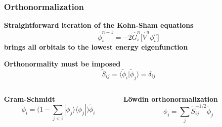 \documentclass[mathserif, 10pt]{beamer}
\begin{document}
\begin{frame}
    \frametitle{Orthonormalization}
    \centering
    \textbf{Straightforward iteration of the Kohn-Sham equations}
    \begin{equation}
        \nonumber
        \tilde{\phi}_i^{n+1} = -2\hat{G}_i^n \bigg[\hat{V}^n\phi_i^n\bigg]
    \end{equation}
    \textbf{brings all orbitals to the lowest energy eigenfunction}
    
    \vspace{15mm}

    \textbf{Orthonormality must be imposed}
    \begin{equation}
        \nonumber
        \tilde{S}_{ij} = \langle\tilde{\phi}_i|\tilde{\phi}_j\rangle = \delta_{ij}
    \end{equation}

    \vspace{5mm}

    \begin{columns}
    \begin{column}[b]{0.5\linewidth}
    \centering
    \textbf{Gram-Schmidt}
    \begin{equation}
	\nonumber
	\phi_i = \Big(1 - \sum_{j<i}|\phi_j\rangle\langle\phi_j|\Big)\tilde{\phi}_i
    \end{equation}
    \end{column}

    \begin{column}[b]{0.5\linewidth}
    \centering
    \textbf{L\"{o}wdin orthonormalization}
    \begin{equation}
	\nonumber
	\phi_i = \sum_j \tilde{S}_{ij}^{-1/2}\tilde{\phi}_j
    \end{equation}
    \end{column}
    \end{columns}
\end{frame}
\end{document}
